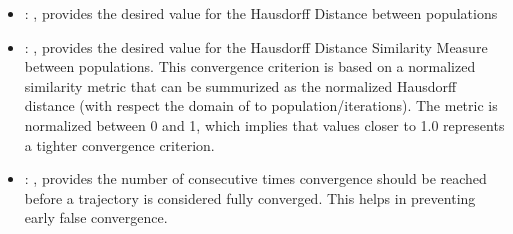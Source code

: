 \begin{itemize}
\begin{itemize}
        \item {}: ,
          provides the desired value for the Hausdorff Distance between populations

        \item {}: ,
          provides the desired value for the Hausdorff Distance Similarity Measure between
          populations.                                     This convergence criterion is based on a
          normalized                                     similarity metric that can be summurized as
          the normalized Hausdorff distance                                     (with respect the
          domain of to population/iterations). The metric is normalized between 0 and 1,
          which implies that values closer to 1.0 represents a tighter convergence criterion.

        \item {}: ,
          provides the number of consecutive times convergence should be reached before a trajectory
          is considered fully converged. This helps in preventing early false convergence.
      \end{itemize}


\end{itemize}
